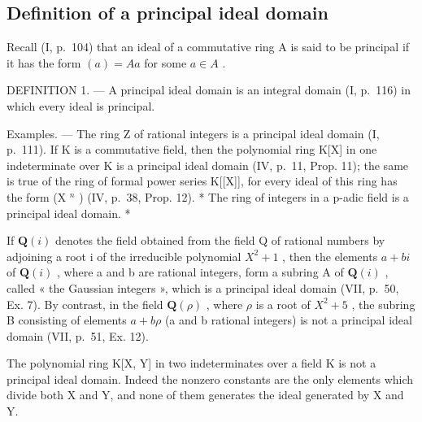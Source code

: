 \subsection{Definition of a principal ideal domain}

Recall (I, p.~104) that an ideal of a commutative ring A is said to be principal if it has the form \((a) = A a\) for some \(a \in A\) .

DEFINITION 1. --- A principal ideal domain is an integral domain (I, p.~116) in which every ideal is principal.

Examples. --- The ring Z of rational integers is a principal ideal domain (I, p.~111). If K is a commutative field, then the polynomial ring K{[}X{]} in one indeterminate over K is a principal ideal domain (IV, p.~11, Prop. 11); the same is true of the ring of formal power series K{[}{[}X{]}{]}, for every ideal of this ring has the form (X \(^{n}\) ) (IV, p.~38, Prop. 12). * The ring of integers in a p-adic field is a principal ideal domain. *

If \(\mathbf{Q}(i)\) denotes the field obtained from the field Q of rational numbers by adjoining a root i of the irreducible polynomial \(X^{2}+1\) , then the elements \(a+bi\) of \(\mathbf{Q}(i)\) , where a and b are rational integers, form a subring A of \(\mathbf{Q}(i)\) , called « the Gaussian integers », which is a principal ideal domain (VII, p.~50, Ex. 7). By contrast, in the field \(\mathbf{Q}(\rho)\) , where \(\rho\) is a root of \(X^{2}+5\) , the subring B consisting of elements \(a+b\rho\) (a and b rational integers) is not a principal ideal domain (VII, p.~51, Ex. 12).

The polynomial ring K{[}X, Y{]} in two indeterminates over a field K is not a principal ideal domain. Indeed the nonzero constants are the only elements which divide both X and Y, and none of them generates the ideal generated by X and Y.


